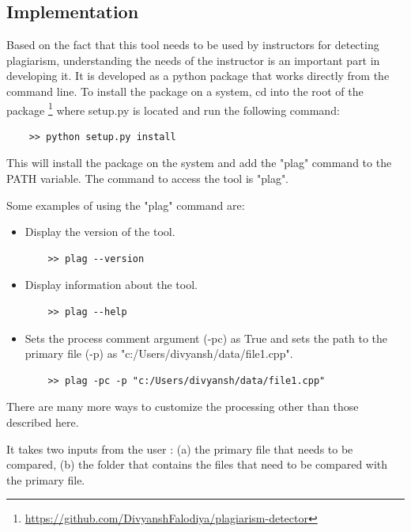 \documentclass[12pt]{article}
\begin{document}
\subsection{Implementation}
Based on the fact that this tool needs to be used by instructors for detecting plagiarism, understanding the needs of the instructor is an important part in developing it. It is developed as a python package that works directly from the command line. To install the package on a system, cd into the root of the package \footnote{\url{https://github.com/DivyanshFalodiya/plagiarism-detector}} where setup.py is located and run the following command:
\begin{verbatim}
    >> python setup.py install
\end{verbatim}
This will install the package on the system and add the "plag" command to the PATH variable.
The command to access the tool is "plag".\par
Some examples of using the "plag" command are:
\begin{itemize}
    \item Display the version of the tool.
    \begin{verbatim}
    >> plag --version
    \end{verbatim}
    
    \item Display information about the tool.
    \begin{verbatim}
    >> plag --help
    \end{verbatim}
    
    \item Sets the process comment argument (-pc) as True and sets the path to the primary file (-p) as "c:/Users/divyansh/data/file1.cpp".
    \begin{verbatim}
    >> plag -pc -p "c:/Users/divyansh/data/file1.cpp"
    \end{verbatim}
\end{itemize}
There are many more ways to customize the processing other than those described here. \par
It takes two inputs from the user : (a) the primary file that needs to be compared, (b) the folder that contains the files that need to be compared with the primary file. \par
\end{document}
